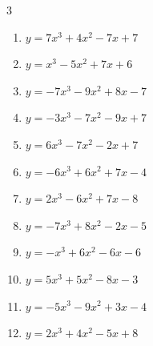 \begin{multicols}{3}
\begin{enumerate}

  \item $y=7x^{3}+4x^{2}-7x+7$


  \item $y=x^{3}-5x^{2}+7x+6$


  \item $y=-7x^{3}-9x^{2}+8x-7$


  \item $y=-3x^{3}-7x^{2}-9x+7$


\columnbreak %

\resetques

  \item $y=6x^{3}-7x^{2}-2x+7$


  \item $y=-6x^{3}+6x^{2}+7x-4$


  \item $y=2x^{3}-6x^{2}+7x-8$


  \item $y=-7x^{3}+8x^{2}-2x-5$


  \item $y=-x^{3}+6x^{2}-6x-6$


  \item $y=5x^{3}+5x^{2}-8x-3$


  \item $y=-5x^{3}-9x^{2}+3x-4$


  \item $y=2x^{3}+4x^{2}-5x+8$


\end{enumerate}
\end{multicols}
